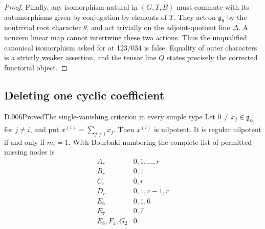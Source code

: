 \begin{proof}
Finally, any isomorphism natural in $(G,T,B)$ must commute with its
automorphisms given by conjugation by elements of $T$.  They act on
$\mathfrak g_\theta$ by the nontrivial root character $\theta$, and
act trivially on the adjoint-quotient line $\Delta$.  A nonzero linear
map cannot intertwine these two actions.  Thus the unqualified
canonical isomorphism asked for at 123/034 is false.  Equality of
outer characters is a strictly weaker assertion, and the tensor
line $Q$ states precisely the corrected functorial object.
\end{proof}

\subsection{Deleting one cyclic coefficient}
\begin{saresult}{D.006}{Proved}{The single-vanishing criterion in every simple type}
Let $0\ne x_j\in\mathfrak g_{\alpha_j}$ for $j\ne i$, and put
$x^{(i)}=\sum_{j\ne i}x_j$.  Then $x^{(i)}$ is nilpotent.  It is
regular nilpotent if and only if $m_i=1$.  With Bourbaki numbering the
complete list of permitted missing nodes is
\[
\begin{array}{c|l}
A_r&0,1,\ldots,r\\
B_r&0,1\\ C_r&0,r\\ D_r&0,1,r-1,r\\
E_6&0,1,6\\ E_7&0,7\\ E_8,F_4,G_2&0.
\end{array}
\]
\end{saresult}
